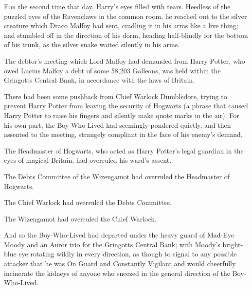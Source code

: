 
\lettrine{F}{or} the second time that day, Harry’s eyes filled with tears. Heedless of the puzzled eyes of the Ravenclaws in the common room, he reached out to the silver creature which Draco Malfoy had sent, cradling it in his arms like a live thing; and stumbled off in the direction of his dorm, heading half-blindly for the bottom of his trunk, as the silver snake waited silently in his arms.


The debtor’s meeting which Lord Malfoy had demanded from Harry Potter, who owed Lucius Malfoy a debt of some 58,203 Galleons, was held within the Gringotts Central Bank, in accordance with the laws of Britain.

There had been some pushback from Chief Warlock Dumbledore, trying to prevent Harry Potter from leaving the security of Hogwarts (a phrase that caused Harry Potter to raise his fingers and silently make quote marks in the air). For his own part, the Boy-Who-Lived had seemingly pondered quietly, and then assented to the meeting, strangely compliant in the face of his enemy’s demand.

The Headmaster of Hogwarts, who acted as Harry Potter’s legal guardian in the eyes of magical Britain, had overruled his ward’s assent.

The Debts Committee of the Wizengamot had overruled the Headmaster of Hogwarts.

The Chief Warlock had overruled the Debts Committee.

The Wizengamot had overruled the Chief Warlock.

And so the Boy-Who-Lived had departed under the heavy guard of Mad-Eye Moody and an Auror trio for the Gringotts Central Bank; with Moody’s bright-blue eye rotating wildly in every direction, as though to signal to any possible attacker that he was On Guard and Constantly Vigilant and would cheerfully incinerate the kidneys of anyone who sneezed in the general direction of the Boy-Who-Lived.

